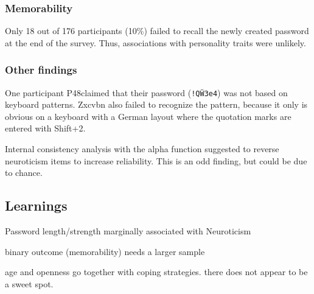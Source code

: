 \subsubsection{Memorability}
Only 18 out of 176 participants (10\%) failed to recall the newly created password at the end of the survey. Thus, associations with personality traits were unlikely.

\subsubsection{Other findings}
One participant P48claimed that their password (\texttt{!Q\"W3e4}) was not based on keyboard patterns. Zxcvbn also failed to recognize the pattern, because it only is obvious on a keyboard with a German layout where the quotation marks are entered with Shift+2. 

Internal consistency analysis with the alpha function suggested to reverse neuroticism items to increase reliability. This is an odd finding, but could be due to chance. 


\subsection{Learnings}
Password length/strength marginally associated with Neuroticism

binary outcome (memorability) needs a larger sample 

age and openness go together with coping strategies. there does not appear to be a sweet spot.
